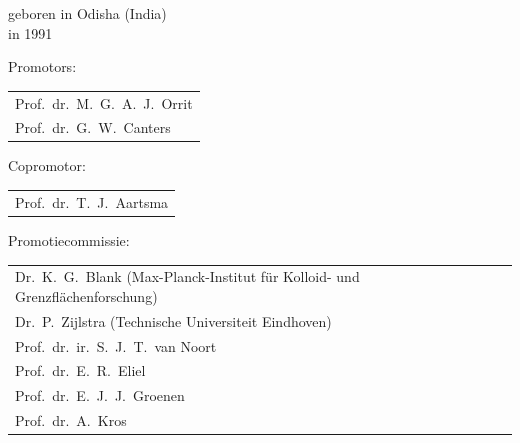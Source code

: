 \begin{titlepage}
\begin{center}
\bigskip
\bigskip


geboren in Odisha (India) \\
in 1991

\vspace*{2\bigskipamount}

\end{center}

\clearpage
\thispagestyle{empty}

\noindent Promotors:

\medskip\noindent
\begin{tabular}{l}
    Prof.~dr.~M.~G.~A.~J.~Orrit \\
    Prof.~dr.~G.~W.~Canters
\end{tabular}

\medskip
\noindent Copromotor:

\medskip\noindent
\begin{tabular}{l}
    Prof.~dr.~T.~J.~Aartsma
\end{tabular}


\medskip
\noindent Promotiecommissie:

\medskip\noindent
\begin{tabular}{ll}
    Dr.~K.~G.~Blank (Max-Planck-Institut für Kolloid- und Grenzflächenforschung) \\
    Dr.~P.~Zijlstra (Technische Universiteit Eindhoven) \\
    Prof.~dr.~ir.~S.~J.~T.\ van Noort \\
    Prof.~dr.~E.~R.~Eliel \\
    Prof.~dr.~E.~J.~J.~Groenen \\
    Prof.~dr.~A.~Kros \\
\end{tabular}



\end{titlepage}
